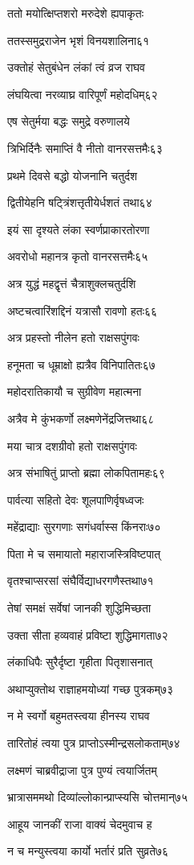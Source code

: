 ततो मयोत्क्षिप्तशरो मरुदेशे ह्यपाकृतः

ततस्समुद्रराजेन भृशं विनयशालिना६१

उक्तोहं सेतुबंधेन लंकां त्वं व्रज राघव

लंघयित्वा नरव्याघ्र वारिपूर्णं महोदधिम्६२

एष सेतुर्मया बद्धः समुद्रे वरुणालये

त्रिभिर्दिनैः समाप्तिं वै नीतो वानरसत्तमैः६३

प्रथमे दिवसे बद्धो योजनानि चतुर्दश

द्वितीयेहनि षट्त्रिंशत्तृतीयेर्धशतं तथा६४

इयं सा दृश्यते लंका स्वर्णप्राकारतोरणा

अवरोधो महानत्र कृतो वानरसत्तमैः६५

अत्र युद्धं महद्वृत्तं चैत्राशुक्लचतुर्दशि

अष्टचत्वारिंशद्दिनं यत्रासौ रावणो हतः६६

अत्र प्रहस्तो नीलेन हतो राक्षसपुंगवः

हनूमता च धूम्राक्षो ह्यत्रैव विनिपातितः६७

महोदरातिकायौ च सुग्रीवेण महात्मना

अत्रैव मे कुंभकर्णो लक्ष्मणेनेंद्रजित्तथा६८

मया चात्र दशग्रीवो हतो राक्षसपुंगवः

अत्र संभाषितुं प्राप्तो ब्रह्मा लोकपितामहः६९

पार्वत्या सहितो देवः शूलपाणिर्वृषध्वजः

महेंद्राद्याः सुरगणाः सगंधर्वास्स किंनराः७०

पिता मे च समायातो महाराजस्त्रिविष्टपात्

वृतश्चाप्सरसां संघैर्विद्याधरगणैस्तथा७१

तेषां समक्षं सर्वेषां जानकी शुद्धिमिच्छता

उक्ता सीता हव्यवाहं प्रविष्टा शुद्धिमागता७२

लंकाधिपैः सुरैर्दृष्टा गृहीता पितृशासनात्

अथाप्युक्तोथ राज्ञाहमयोध्यां गच्छ पुत्रकम्७३

न मे स्वर्गो बहुमतस्त्वया हीनस्य राघव

तारितोहं त्वया पुत्र प्राप्तोऽस्मीन्द्रसलोकताम्७४

लक्ष्मणं चाब्रवीद्राजा पुत्र पुण्यं त्वयार्जितम्

भ्रात्रासममथो दिव्यांल्लोकान्प्राप्स्यसि चोत्तमान्७५

आहूय जानकीं राजा वाक्यं चेदमुवाच ह

न च मन्युस्त्वया कार्यो भर्तारं प्रति सुव्रते७६

